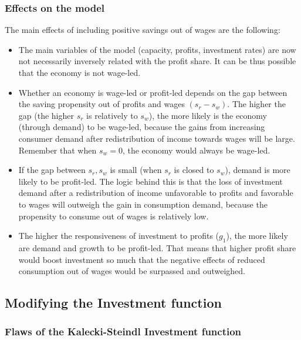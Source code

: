 \documentclass[
  letterpaper,
  DIV=11,
  numbers=noendperiod]{scrreprt}
\begin{document}
\hypertarget{effects-on-the-model}{%
\subsubsection{Effects on the model}\label{effects-on-the-model}}

The main effects of including positive savings out of wages are the
following:

\begin{itemize}
\item
  The main variables of the model (capacity, profits, investment rates)
  are now not necessarily inversely related with the profit share. It
  can be thus possible that the economy is not wage-led.
\item
  Whether an economy is wage-led or profit-led depends on the gap
  between the saving propensity out of profits and wages \((s_r-s_w)\).
  The higher the gap (the higher \(s_r\) is relatively to \(s_w\)), the
  more likely is the economy (through demand) to be wage-led, because
  the gains from increasing consumer demand after redistribution of
  income towards wages will be large. Remember that when \(s_w =0\), the
  economy would always be wage-led.
\item
  If the gap between \(s_r, s_w\) is small (when \(s_r\) is closed to
  \(s_w\)), demand is more likely to be profit-led. The logic behind
  this is that the loss of investment demand after a redistribution of
  income unfavorable to profits and favorable to wages will outweigh the
  gain in consumption demand, because the propensity to consume out of
  wages is relatively low.
\item
  The higher the responsiveness of investment to profits (\(g_1\)), the
  more likely are demand and growth to be profit-led. That means that
  higher profit share would boost investment so much that the negative
  effects of reduced consumption out of wages would be surpassed and
  outweighed.
\end{itemize}

\hypertarget{modifying-the-investment-function}{%
\subsection{Modifying the Investment
function}\label{modifying-the-investment-function}}

\hypertarget{flaws-of-the-kalecki-steindl-investment-function}{%
\subsubsection{Flaws of the Kalecki-Steindl Investment
function}\label{flaws-of-the-kalecki-steindl-investment-function}}
\end{document}
